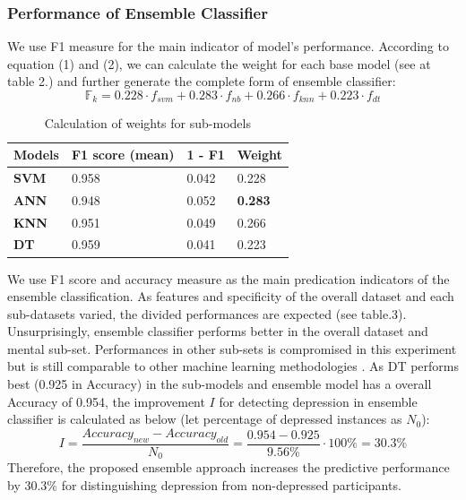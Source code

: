 \documentclass[10pt,journal,compsoc]{IEEEtran}
\begin{document}
\subsubsection{Performance of Ensemble Classifier}
We use F1 measure for the main indicator of model's performance. According to equation (1) and (2), we can calculate the weight for each base model (see at table 2.) and further generate the complete form of ensemble classifier:
\begin{equation}
\mathbb{F}_{k} = 0.228 \cdot f_{svm} + 0.283 \cdot f_{nb} + 0.266 \cdot f_{knn} + 0.223 \cdot f_{dt}
\end{equation}
\begin{table}[ht]
\begin{tabular}{|C{3cm}|C{3cm}|C{3cm}|C{3cm}|}
\hline
{} 
{\color[HTML]{333333} \textbf{Models}} & {\color[HTML]{333333} \textbf{F1 score (mean)}} & {\color[HTML]{333333} \textbf{1 - F1}} & {\color[HTML]{333333} \textbf{Weight}} \\ \hline
{} 
\textbf{SVM}& 0.958  & 0.042  & 0.228 \\ \hline
{} 
\textbf{ANN} & 0.948  & 0.052   & \textbf{0.283}    \\ \hline
{} 
\textbf{KNN} & 0.951   & 0.049  & 0.266 \\ \hline
{} 
\textbf{DT}  & 0.959  & 0.041  & 0.223  \\ \hline
\end{tabular}
\caption{Calculation of weights for sub-models}
\label{weight}
\end{table}

We use F1 score and accuracy measure as the main predication indicators of the ensemble classification. As features and specificity of the overall dataset and each sub-datasets varied, the divided performances are expected (see table.3). Unsurprisingly, ensemble classifier performs better in the overall dataset and mental sub-set. Performances in other sub-sets is compromised in this experiment but is still comparable to other machine learning methodologies \cite{Fatima}\cite{Hassan}\cite{Peng}\cite{Reece}. As DT performs best (0.925 in Accuracy) in the sub-models and ensemble model has a overall Accuracy of 0.954, the improvement $I$ for detecting depression in ensemble classifier is calculated as below (let percentage of depressed instances as $N_{0}$):\\
\begin{equation}\label{reio}
	 I = \frac{Accuracy_{new} - Accuracy_{old}}{N_{0}} = \frac{0.954 - 0.925}{9.56\%} \cdot 100\% = 30.3\%
\end{equation}
Therefore, the proposed ensemble approach increases the predictive performance by 30.3\% for distinguishing depression from non-depressed participants.
\end{document}
